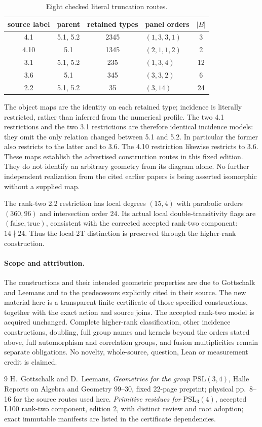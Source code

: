 \documentclass[11pt]{article}
\begin{document}
\begin{table}[h]\centering
\begin{tabular}{ccclc}\toprule
source label&parent&retained types&panel orders&$|B|$\\\midrule
4.1&5.1, 5.2&2345&$(1,3,3,1)$&3\\
4.10&5.1&1345&$(2,1,1,2)$&2\\
3.1&5.1, 5.2&235&$(1,3,4)$&12\\
3.6&5.1&345&$(3,3,2)$&6\\
2.2&5.1, 5.2&35&$(3,14)$&24\\\bottomrule
\end{tabular}
\caption{Eight checked literal truncation routes.}\label{tab:trunc}
\end{table}

The object maps are the identity on each retained type; incidence is
literally restricted, rather than inferred from the numerical profile.
The two 4.1 restrictions and the two 3.1 restrictions are therefore
identical incidence models: they omit the only relation changed between
5.1 and 5.2. In particular the former also restricts to the latter and to
3.6. The 4.10 restriction likewise restricts to 3.6. These maps establish
the advertised construction routes in this fixed edition. They do not
identify an arbitrary geometry from its diagram alone. No further
independent realization from the cited earlier papers is being asserted
isomorphic without a supplied map.

The rank-two 2.2 restriction has local degrees $(15,4)$ with parabolic
orders $(360,96)$ and intersection order 24. Its actual local
double-transitivity flags are $(\mathrm{false},\mathrm{true})$, consistent
with the corrected accepted rank-two component: $14\nmid24$. Thus the
local-2T distinction is preserved through the higher-rank construction.

\paragraph{Scope and attribution.}
The constructions and their intended geometric properties are due to
Gottschalk and Leemans and to the predecessors explicitly cited in their
source. The new material here is a transparent finite certificate of those
specified constructions, together with the exact action and source joins.
The accepted rank-two model is acquired unchanged. Complete higher-rank
classification, other incidence constructions, doubling, full group names
and kernels beyond the orders stated above, full automorphism and
correlation groups, and fusion multiplicities remain separate obligations.
No novelty, whole-source, question, Lean or measurement credit is claimed.

\begin{thebibliography}{9}
 H.~Gottschalk and D.~Leemans, \emph{Geometries for the group
$\mathrm{PSL}(3,4)$}, Halle Reports on Algebra and Geometry 99--30,
fixed 22-page preprint; physical pp.~8--16 for the source routes used here.
 \emph{Primitive residues for $\mathrm{PSL}_3(4)$}, accepted
L100 rank-two component, edition 2, with distinct review and root adoption;
exact immutable manifests are listed in the certificate dependencies.
\end{thebibliography}
\end{document}
